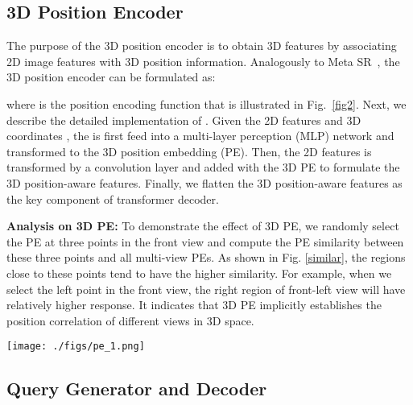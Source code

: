 \documentclass[runningheads]{llncs}
\begin{document}
\subsection{3D Position Encoder}
The purpose of the 3D position encoder is to obtain 3D features  by associating 2D image features  with 3D position information. Analogously to Meta SR~\cite{hu2019metasr}, the 3D position encoder can be formulated as:

where  is the position encoding function that is illustrated in Fig.~\ref{fig2}. Next, we describe the detailed implementation of .
Given the 2D features  and 3D coordinates , the  is first feed into a multi-layer perception (MLP) network and transformed to the 3D position embedding (PE). Then, the 2D features  is transformed by a  convolution layer and added with the 3D PE to formulate the 3D position-aware features. Finally, we flatten the 3D position-aware features as the key component of transformer decoder. 


\noindent \textbf{Analysis on 3D PE:} To demonstrate the effect of 3D PE, we randomly select the PE at three points in the front view and compute the PE similarity between these three points and all multi-view PEs. As shown in Fig. \ref{similar}, the regions close to these points tend to have the higher similarity. For example, when we select the left point in the front view, the right region of front-left view will have relatively higher response. It indicates that 3D PE implicitly establishes the position correlation of different views in 3D space.

\begin{figure*}[t]
	\centering  
	\texttt{[image: ./figs/pe\_1.png]}  
	\caption{3D position embedding similarity. The red points are selected positions in the front view. We calculated the similarity between the position embedding of these selected positions and all image views. It shows that the regions close to these selective points tend to have  higher similarity.}
	\label{similar}
\end{figure*}

\subsection{Query Generator and Decoder}
\end{document}
